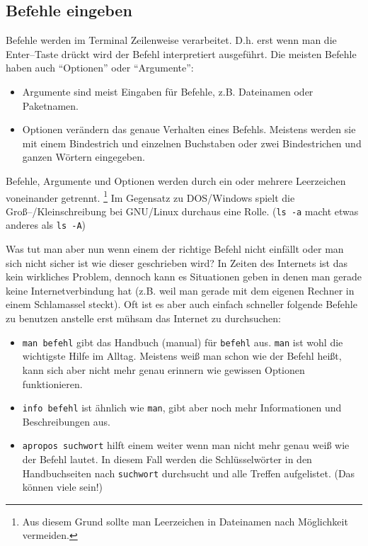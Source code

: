\subsection{Befehle eingeben}
Befehle werden im Terminal Zeilenweise verarbeitet. D.h. erst wenn man die Enter--Taste drückt wird der Befehl interpretiert ausgeführt. Die meisten Befehle haben auch ``Optionen'' oder ``Argumente'':
\begin{itemize}
 \item Argumente sind meist Eingaben für Befehle, z.B. Dateinamen oder Paketnamen.
 \item Optionen verändern das genaue Verhalten eines Befehls. Meistens werden sie mit einem Bindestrich und einzelnen Buchstaben oder zwei Bindestrichen und ganzen Wörtern eingegeben.
\end{itemize}
Befehle, Argumente und Optionen werden durch ein oder mehrere Leerzeichen voneinander getrennt. \footnote{Aus diesem Grund sollte man Leerzeichen in Dateinamen nach Möglichkeit vermeiden.} Im Gegensatz zu DOS/Windows spielt die Groß--/Kleinschreibung bei GNU/Linux durchaus eine Rolle. (\lstinline|ls -a| macht etwas anderes als \lstinline|ls -A|)\par
Was tut man aber nun wenn einem der richtige Befehl nicht einfällt oder man sich nicht sicher ist wie dieser geschrieben wird? In Zeiten des Internets ist das kein wirkliches Problem, dennoch kann es Situationen geben in denen man gerade keine Internetverbindung hat (z.B. weil man gerade mit dem eigenen Rechner in einem Schlamassel steckt). Oft ist es aber auch einfach schneller folgende Befehle zu benutzen anstelle erst mühsam das Internet zu durchsuchen:
\begin{itemize}
 \item \lstinline|man befehl| gibt das Handbuch (manual) für \lstinline|befehl| aus. \lstinline|man| ist wohl die wichtigste Hilfe im Alltag. Meistens weiß man schon wie der Befehl heißt, kann sich aber nicht mehr genau erinnern wie gewissen Optionen funktionieren.
 \item \lstinline|info befehl| ist ähnlich wie \lstinline|man|, gibt aber noch mehr Informationen und Beschreibungen aus.
 \item \lstinline|apropos suchwort| hilft einem weiter wenn man nicht mehr genau weiß wie der Befehl lautet. In diesem Fall werden die Schlüsselwörter in den Handbuchseiten nach \lstinline|suchwort| durchsucht und alle Treffen aufgelistet. (Das können viele sein!)
\end{itemize}

